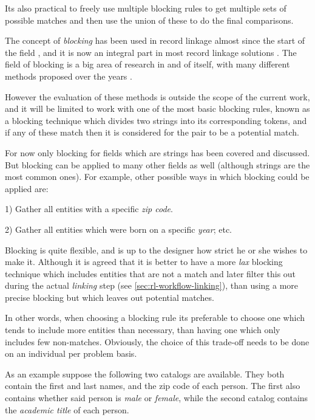 \documentclass[epsfig,a4paper,11pt,titlepage,twoside,openany]{book}
\begin{document}
Its also practical to freely use multiple blocking
rules to get multiple sets of possible matches and then use the union of these
to do the final comparisons.

The concept of \textit{blocking} has been used in record linkage almost since
the start of the field \cite{fellegi69_theor_recor_linkag}, and it is now an
integral part in most record linkage solutions \cite{winkler2006overview}. The
field of blocking is a big area of research in and of itself, with many
different methods proposed over the years
\cite{christen12_survey_index_techn_scalab_recor_linkag_dedup, Baxter2003ACO}.

However the evaluation of these methods is outside the scope of the current
work, and it will be limited to work with one of the most basic blocking rules,
known as a blocking technique which divides two strings into its corresponding
tokens, and if any of these match then it is considered for the pair to be a potential match.

For now only blocking for fields which are strings has been covered and discussed. But
blocking can be applied to many other fields as well (although strings are the
most common ones). For example, other possible ways in which blocking could be applied are: 

1) Gather all entities with a specific \textit{zip code}. 

2) Gather all entities which were born on a specific \textit{year}; etc.

Blocking is quite flexible, and is up to the designer how strict he or she wishes to make it.
Although it is agreed
\cite{christen12_survey_index_techn_scalab_recor_linkag_dedup} that it is better
to have a more \textit{lax} blocking technique which includes entities that are
not a match and later filter this out during the actual \textit{linking} step
(see \autoref{sec:rl-workflow-linking}), than using a more precise blocking but
which leaves out potential matches. 

In other words, when choosing a blocking rule its preferable to choose one which tends to include more entities than necessary, than having one which only includes few non-matches. Obviously, the choice of this trade-off needs to be done on an individual per problem basis.

As an example suppose the following two catalogs are available. They both contain the
first and last names, and the zip code of each person. The first also contains
whether said person is \textit{male} or \textit{female}, while the second catalog
contains the \textit{academic title} of each person.
\end{document}
